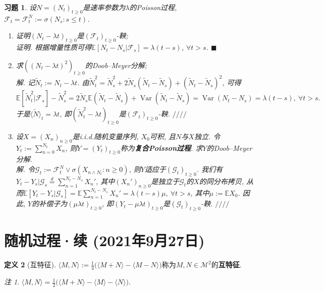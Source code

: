 \documentclass{ctexart}
\theoremstyle{definition}
\newtheorem{Def}{定义}[section]
\theoremstyle{remark}
\newtheorem{Rmk}[Def]{注}
\theoremstyle{plain}
\newtheorem{Ex}{习题}[section]
\newenvironment{Soln}{\vspace{1ex}\textbf{\\}{\color{red}\textit{解}}.\normalfont}{\color{red}\hfill$/\!/\!/\!/$\vspace{1ex}\par}
\newenvironment{Prf}{\vspace{1ex}\textbf{\\}{\color{red}\textit{证明}}.\normalfont}{\color{red}\hfill$\blacksquare$\vspace{1ex}\par}
\newcommand{\1}{\mathbbm{1}}				%
\newcommand{\E}{\mathbb{E}}					%
\newcommand{\Var}{\operatorname{Var}}		%
\newcommand{\agp}[1]{\langle #1 \rangle}	%
\begin{document}
\begin{Ex}\label{Ex:Poisson_process_Doob-Meyer}
设$N = (N_{t})_{t \ge 0}$是速率参数为$\lambda$的Poisson过程, $\mathscr{F}_{t} = \mathscr{F}_{t}^{N} := \sigma(N_{s} : s \le t)$.
\begin{enumerate}
\setlength{\itemsep}{0ex}
	\item 证明$(N_{t} - \lambda t)_{t \ge 0}$是$(\mathscr{F}_{t})_{t \ge 0}$-鞅;
\begin{Prf}
根据增量性质可得$\E[N_{t}-N_{s}|\mathscr{F}_{s}] = \lambda (t-s)$, $\forall t > s$.
\end{Prf}
	\item 求$((N_{t} - \lambda t)^{2})_{t \ge 0}$的Doob--Meyer分解;
\begin{Soln}
记$\tilde{N}_{t} := N_{t} - \lambda t$. 由$\tilde{N}_{t}^{2} = \tilde{N}_{s}^{2} + 2 \tilde{N}_{s} (\tilde{N}_{t}-\tilde{N}_{s}) + (\tilde{N}_{t}-\tilde{N}_{s})^{2}$, 可得
\[ \E[\tilde{N}_{t}^{2}|\mathscr{F}_{s}] - \tilde{N}_{s}^{2} = 2 \tilde{N}_{s} \E(\tilde{N}_{t}-\tilde{N}_{s}) + \Var(\tilde{N}_{t}-\tilde{N}_{s}) = \Var(N_{t}-N_{s}) = \lambda (t-s) , \ \forall t > s . \]
于是$\agp{\tilde{N}}_{t} = \lambda t$, 即$(\tilde{N}_{t}^{2} - \lambda t)_{t \ge 0}$是$(\mathscr{F}_{t})_{t \ge 0}$-鞅.
\end{Soln}
	\item 设$X = (X_{n})_{n \ge 0}$是i.i.d.随机变量序列, $X_{0}$可积, 且$N$与$X$独立. 令$Y_{t} := \sum_{n=0}^{N_t} X_{n}$, 则$Y = (Y_{t})_{t \ge 0}$称为\textbf{复合Poisson过程}. 求$Y$的Doob--Meyer分解.
\begin{Soln}
令$\mathscr{G}_{t} := \mathscr{F}_{t}^{N} \vee \sigma(X_{n\wedge N_{t}} : n \ge 0)$, 则$Y$适应于$(\mathscr{G}_{t})_{t \ge 0}$. 我们有$Y_{t}-Y_{s}|\mathscr{G}_{s} \stackrel{d}{=} \sum_{n=1}^{N_{t}-N_{s}} X_{n}'$, 其中$(X_{n}')_{n \ge 0}$是独立于$\mathscr{G}_{t}$的$X$的同分布拷贝, 从而$\E[Y_{t}-Y_{s}|\mathscr{G}_{s}] = \E\sum_{n=1}^{N_{t}-N_{s}} X_{n}' = \lambda (t-s) \mu$, $\forall t > s$, 其中$\mu := \E X_{0}$. 因此, $Y$的补偿子为$(\mu \lambda t)_{t \ge 0}$, 即$(Y_{t} - \mu \lambda t)_{t \ge 0}$是$(\mathscr{G}_{t})_{t \ge 0}$-鞅.
\end{Soln}
\end{enumerate}
\end{Ex}



\section{随机过程·续 \normalfont\footnotesize (2021年9月27日)}
\begin{Def}[互特征]
$\agp{M,N} := \frac{1}{4}\big( \agp{M+N} - \agp{M-N} \big)$称为$M,N \in \mathcal{M}^2$的\textbf{互特征}.
\begin{Rmk}
$\agp{M,N} = \frac{1}{2}\big( \agp{M+N} - \agp{M} - \agp{N} \big)$.
\end{Rmk}
\end{Def}
\end{document}
